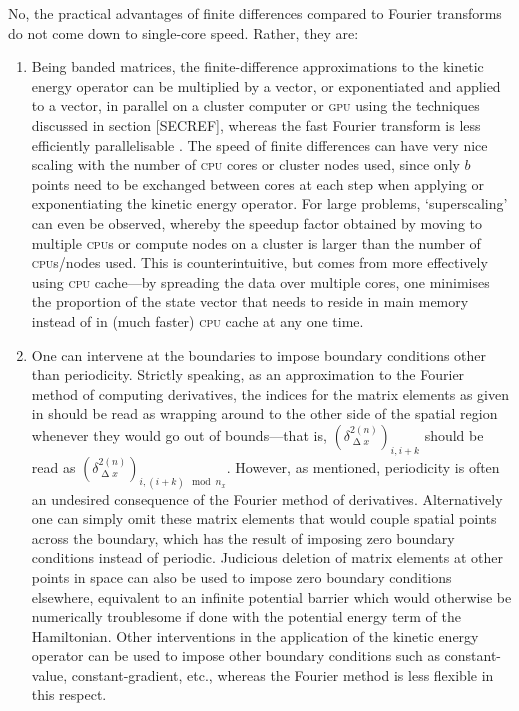 No, the practical advantages of finite differences compared to Fourier transforms do not come down to single-core speed. Rather, they are:
\begin{enumerate}
    \item Being banded matrices, the finite-difference approximations to the kinetic energy operator can be multiplied by a vector, or exponentiated and applied to a vector, in parallel on a cluster computer or \textsc{gpu} using the techniques discussed in section [SECREF], whereas the fast Fourier transform is less efficiently parallelisable \cite{Gupta93thescalability}. The speed of finite differences can have very nice scaling with the number of \textsc{cpu} cores or cluster nodes used, since only $b$ points need to be exchanged between cores at each step when applying or exponentiating the kinetic energy operator. For large problems, `superscaling' can even be observed, whereby the speedup factor obtained by moving to multiple \textsc{cpu}s or compute nodes on a cluster is larger than the number of \textsc{cpu}s/nodes used. This is counterintuitive, but comes from more effectively using \textsc{cpu} cache---by spreading the data over multiple cores, one minimises the proportion of the state vector that needs to reside in main memory instead of in (much faster) \textsc{cpu} cache at any one time.
    \item One can intervene at the boundaries to impose boundary conditions other than periodicity. Strictly speaking, as an approximation to the Fourier method of computing derivatives, the indices for the matrix elements as given in  should be read as wrapping around to the other side of the spatial region whenever they would go out of bounds---that is, $(\delta^{2 (n)}_{\upDelta x})_{i, i + k}$ should be read as $(\delta^{2 (n)}_{\upDelta x})_{i, (i + k) \mod n_x}$. However, as mentioned, periodicity is often an undesired consequence of the Fourier method of derivatives. Alternatively one can simply omit these matrix elements that would couple spatial points across the boundary, which has the result of imposing zero boundary conditions instead of periodic. Judicious deletion of matrix elements at other points in space can also be used to impose zero boundary conditions elsewhere, equivalent to an infinite potential barrier which would otherwise be numerically troublesome if done with the potential energy term of the Hamiltonian. Other interventions in the application of the kinetic energy operator can be used to impose other boundary conditions such as constant-value, constant-gradient, etc., whereas the Fourier method is less flexible in this respect.

\end{enumerate}
